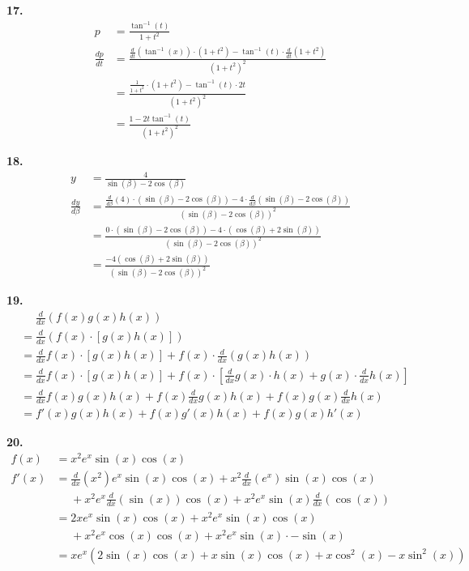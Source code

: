 \documentclass[10pt,oneside,]{book}
\theoremstyle{plain}
\theoremstyle{definition}
\numberwithin{equation}{section}
\newcommand{\fe}[2]{#1\mathopen{}\left(#2\right)\mathclose{}}
\newcommand{\fd}[1]{#1'}
\newcommand{\lz}[2]{\frac{d#1}{d#2}}
\newcommand{\lzo}[1]{\frac{d}{d#1}}
\newcommand{\lzoo}[2]{{\frac{d}{d#1}}{\left(#2\right)}}
\begin{document}
\par\smallskip
\noindent\textbf{17.}\quad{}\begin{align*}
p&=\frac{\fe{\tan^{-1}}{t}}{1+t^2}\\
\lz{p}{t}&=\frac{\lzoo{t}{\fe{\tan^{-1}}{x}}\cdot\left(1+t^2\right)-\fe{\tan^{-1}}{t}\cdot\lzoo{t}{1+t^2}}{\left(1+t^2\right)^2}\\
&=\frac{\frac{1}{1+t^2}\cdot\left(1+t^2\right)-\fe{\tan^{-1}}{t}\cdot2t}{\left(1+t^2\right)^2}\\
&=\frac{1-2t\fe{\tan^{-1}}{t}}{\left(1+t^2\right)^2}
\end{align*}%
\par\smallskip
\noindent\textbf{18.}\quad{}\begin{align*}
y&=\frac{4}{\fe{\sin}{\beta}-2\fe{\cos}{\beta}}\\
\lz{y}{\beta}&=\frac{\lzoo{\beta}{4}\cdot\left(\fe{\sin}{\beta}-2\fe{\cos}{\beta}\right)-4\cdot\lzoo{\beta}{\fe{\sin}{\beta}-2\fe{\cos}{\beta}}}{\left(\fe{\sin}{\beta}-2\fe{\cos}{\beta}\right)^2}\\
&=\frac{0\cdot\left(\fe{\sin}{\beta}-2\fe{\cos}{\beta}\right)-4\cdot\left(\fe{\cos}{\beta}+2\fe{\sin}{\beta}\right)}{\left(\fe{\sin}{\beta}-2\fe{\cos}{\beta}\right)^2}\\
&=\frac{-4\left(\fe{\cos}{\beta}+2\fe{\sin}{\beta}\right)}{\left(\fe{\sin}{\beta}-2\fe{\cos}{\beta}\right)^2}
\end{align*}%
\par\smallskip
\noindent\textbf{19.}\quad{}\begin{align*}
&\phantom{={}}\lzoo{x}{\fe{f}{x}\fe{g}{x}\fe{h}{x}}\\
&=\lzoo{x}{\fe{f}{x}\cdot\left[\fe{g}{x}\fe{h}{x}\right]}\\
&=\lzo{x}{\fe{f}{x}}\cdot\left[\fe{g}{x}\fe{h}{x}\right]+\fe{f}{x}\cdot\lzoo{x}{\fe{g}{x}\fe{h}{x}}\\
&=\lzo{x}{\fe{f}{x}}\cdot\left[\fe{g}{x}\fe{h}{x}\right]+\fe{f}{x}\cdot\left[\lzo{x}{\fe{g}{x}}\cdot\fe{h}{x}+\fe{g}{x}\cdot\lzo{x}{\fe{h}{x}}\right]\\
&=\lzo{x}{\fe{f}{x}}\fe{g}{x}\fe{h}{x}+\fe{f}{x}\lzo{x}{\fe{g}{x}}\fe{h}{x}+\fe{f}{x}\fe{g}{x}\lzo{x}{\fe{h}{x}}\\
&=\fe{\fd{f}}{x}\fe{g}{x}\fe{h}{x}+\fe{f}{x}\fe{\fd{g}}{x}\fe{h}{x}+\fe{f}{x}\fe{g}{x}\fe{\fd{h}}{x}
\end{align*}%
\par\smallskip
\noindent\textbf{20.}\quad{}\begin{align*}
\fe{f}{x}&=x^2e^x\fe{\sin}{x}\fe{\cos}{x}\\
\fe{\fd{f}}{x}&=\lzoo{x}{x^2}e^x\fe{\sin}{x}\fe{\cos}{x}+x^2\lzoo{x}{e^x}\fe{\sin}{x}\fe{\cos}{x}\\
&\phantom{{}={}}{}+x^2e^x\lzoo{x}{\fe{\sin}{x}}\fe{\cos}{x}+x^2e^x\fe{\sin}{x}\lzoo{x}{\fe{\cos}{x}}\\
&=2xe^x\fe{\sin}{x}\fe{\cos}{x}+x^2e^x\fe{\sin}{x}\fe{\cos}{x}\\
&\phantom{{}={}}{}+x^2e^x\fe{\cos}{x}\fe{\cos}{x}+x^2e^x\fe{\sin}{x}\cdot-\fe{\sin}{x}\\
&=xe^x\left(2\fe{\sin}{x}\fe{\cos}{x}+x\fe{\sin}{x}\fe{\cos}{x}+x\fe{\cos^2}{x}-x\fe{\sin^2}{x}\right)
\end{align*}%
\end{document}

